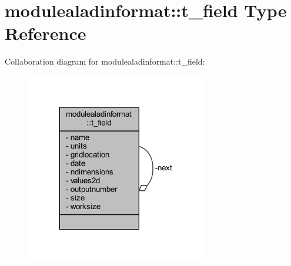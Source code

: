 \hypertarget{structmodulealadinformat_1_1t__field}{}\section{modulealadinformat\+:\+:t\+\_\+field Type Reference}
\label{structmodulealadinformat_1_1t__field}


Collaboration diagram for modulealadinformat\+:\+:t\+\_\+field\+:\nopagebreak
\begin{figure}[H]
\begin{center}
\leavevmode
\includegraphics[width=224pt]{structmodulealadinformat_1_1t__field__coll__graph}
\end{center}
\end{figure}
